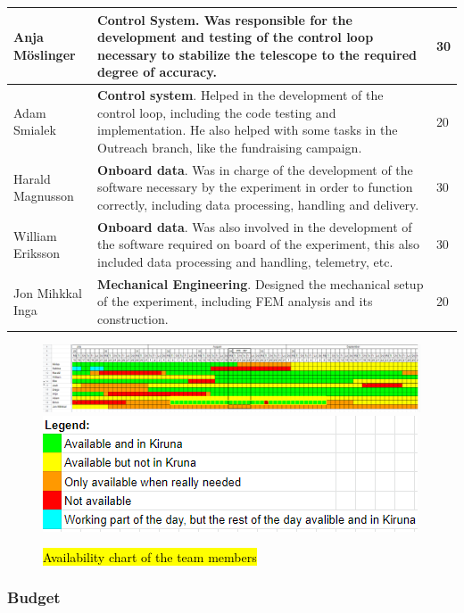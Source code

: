 \begin{longtable}{m{} | m{} | m{}}
	Anja M{\"o}slinger & \textbf{Control System}. Was responsible for the development and testing of the control loop necessary to stabilize the telescope to the required degree of accuracy. & 30 \\ \hline
	Adam Smialek & \textbf{Control system}.  Helped in the development of the control loop, including the code testing and implementation. He also helped with some tasks in the Outreach branch, like the fundraising campaign. & 20 \\ \hline
	Harald Magnusson & \textbf{Onboard data}. Was in charge of the development of the software necessary by the experiment in order to function correctly, including data processing, handling and delivery. & 30 \\ \hline
	William Eriksson & \textbf{Onboard data}. Was also involved in the development of the software required on board of the experiment, this also included data processing and handling, telemetry, etc. & 30 \\ \hline
	Jon Mihkkal Inga & \textbf{Mechanical Engineering}. Designed the mechanical setup of the experiment, including FEM analysis and its construction. & 20 \\ \hline

\end{longtable}

\newpage
\begin{landscape}
	\begin{figure}[H]
		\includegraphics[scale=1.2]{3-project-planning/img/availability.png}
		\includegraphics[scale=1.2]{3-project-planning/img/Availability_legend.png}
		\caption{\hl{Availability chart of the team members}}
	\end{figure}
\end{landscape}

\newpage
\subsubsection{Budget}
\label{sec:3.2.2}

